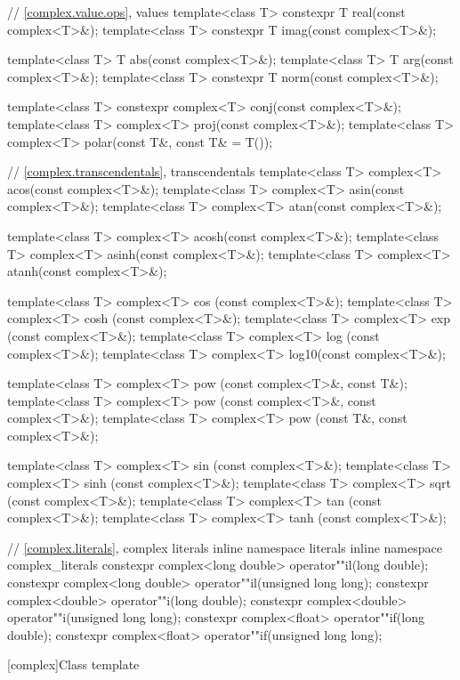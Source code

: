\begin{codeblock}
{  // \ref{complex.value.ops}, values
  template<class T> constexpr T real(const complex<T>&);
  template<class T> constexpr T imag(const complex<T>&);

  template<class T> T abs(const complex<T>&);
  template<class T> T arg(const complex<T>&);
  template<class T> constexpr T norm(const complex<T>&);

  template<class T> constexpr complex<T> conj(const complex<T>&);
  template<class T> complex<T> proj(const complex<T>&);
  template<class T> complex<T> polar(const T&, const T& = T());

  // \ref{complex.transcendentals}, transcendentals
  template<class T> complex<T> acos(const complex<T>&);
  template<class T> complex<T> asin(const complex<T>&);
  template<class T> complex<T> atan(const complex<T>&);

  template<class T> complex<T> acosh(const complex<T>&);
  template<class T> complex<T> asinh(const complex<T>&);
  template<class T> complex<T> atanh(const complex<T>&);

  template<class T> complex<T> cos  (const complex<T>&);
  template<class T> complex<T> cosh (const complex<T>&);
  template<class T> complex<T> exp  (const complex<T>&);
  template<class T> complex<T> log  (const complex<T>&);
  template<class T> complex<T> log10(const complex<T>&);

  template<class T> complex<T> pow  (const complex<T>&, const T&);
  template<class T> complex<T> pow  (const complex<T>&, const complex<T>&);
  template<class T> complex<T> pow  (const T&, const complex<T>&);

  template<class T> complex<T> sin  (const complex<T>&);
  template<class T> complex<T> sinh (const complex<T>&);
  template<class T> complex<T> sqrt (const complex<T>&);
  template<class T> complex<T> tan  (const complex<T>&);
  template<class T> complex<T> tanh (const complex<T>&);

  // \ref{complex.literals}, complex literals
  inline namespace literals {
  inline namespace complex_literals {
    constexpr complex<long double> operator""il(long double);
    constexpr complex<long double> operator""il(unsigned long long);
    constexpr complex<double> operator""i(long double);
    constexpr complex<double> operator""i(unsigned long long);
    constexpr complex<float> operator""if(long double);
    constexpr complex<float> operator""if(unsigned long long);
  }
  }
}
\end{codeblock}

[complex]{Class template }

